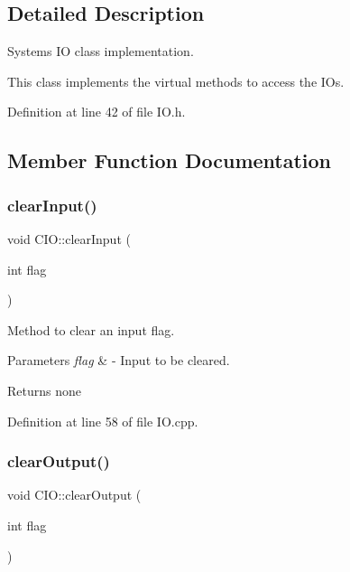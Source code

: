 \subsection{Detailed Description}
System\textquotesingle{}s IO class implementation. 

This class implements the virtual methods to access the I\+Os. 

Definition at line 42 of file I\+O.\+h.



\subsection{Member Function Documentation}
\mbox{\label{class_c_i_o_a5fddf5dbe86f9baac7e2c75dcd9d35e6}} 
\subsubsection{\texorpdfstring{clear\+Input()}{clearInput()}}
{\footnotesize\ttfamily void C\+I\+O\+::clear\+Input (\begin{DoxyParamCaption}\item[{int}]{flag }\end{DoxyParamCaption})}



Method to clear an input flag. 


\begin{DoxyParams}{Parameters}
{\em flag} & -\/ Input to be cleared. \\
\hline
\end{DoxyParams}
\begin{DoxyReturn}{Returns}
none 
\end{DoxyReturn}


Definition at line 58 of file I\+O.\+cpp.

\mbox{\label{class_c_i_o_aa37612a9e9adfce7bf9b3a943bf961de}} 
\subsubsection{\texorpdfstring{clear\+Output()}{clearOutput()}}
{\footnotesize\ttfamily void C\+I\+O\+::clear\+Output (\begin{DoxyParamCaption}\item[{int}]{flag }\end{DoxyParamCaption})}



